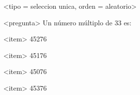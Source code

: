 <tipo = seleccion unica, orden = aleatorio>

<pregunta>
Un número múltiplo de 33 es:

<item>
45276

<item>
45176

<item>
45076

<item>
45376

